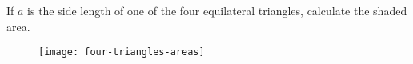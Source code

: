 If $a$ is the side length of one of the four equilateral triangles, calculate the shaded area. 

\begin{figure}[H]
\centering
\texttt{[image: four-triangles-areas]}
\end{figure}
